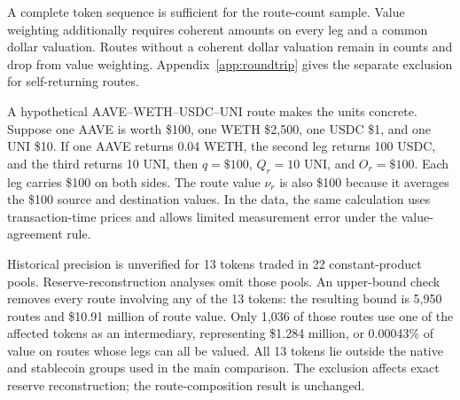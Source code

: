 A complete token sequence is sufficient for the route-count sample. Value weighting additionally requires coherent amounts on every leg and a common dollar valuation. Routes without a coherent dollar valuation remain in counts and drop from value weighting. Appendix~\ref{app:roundtrip} gives the separate exclusion for self-returning routes.

A hypothetical AAVE--WETH--USDC--UNI route makes the units concrete. Suppose one AAVE is worth \$100, one WETH \$2,500, one USDC \$1, and one UNI \$10. If one AAVE returns 0.04 WETH, the second leg returns 100 USDC, and the third returns 10 UNI, then $q=\$100$, $Q_r=10$ UNI, and $O_r=\$100$. Each leg carries \$100 on both sides. The route value $\nu_r$ is also \$100 because it averages the \$100 source and destination values. In the data, the same calculation uses transaction-time prices and allows limited measurement error under the value-agreement rule.

Historical precision is unverified for 13 tokens traded in 22 constant-product pools. Reserve-reconstruction analyses omit those pools. An upper-bound check removes every route involving any of the 13 tokens: the resulting bound is 5,950 routes and \$10.91 million of route value. Only 1,036 of those routes use one of the affected tokens as an intermediary, representing \$1.284 million, or 0.00043\% of value on routes whose legs can all be valued. All 13 tokens lie outside the native and stablecoin groups used in the main comparison. The exclusion affects exact reserve reconstruction; the route-composition result is unchanged.

\begin{table}[htbp]
\centering
\small
\caption{Protocol architecture and native-asset pairing}
\label{tab:app:v1-architecture}

\end{table}

